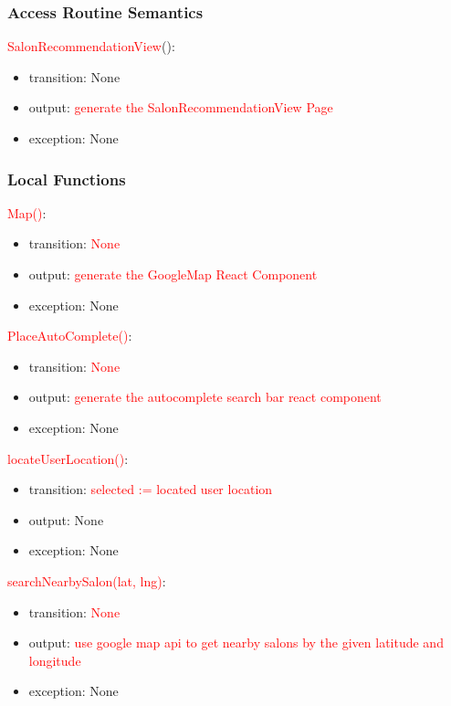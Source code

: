 \documentclass[12pt, titlepage]{article}
\begin{document}
\subsubsection{Access Routine Semantics}
\noindent \textcolor{red}{SalonRecommendationView}():
\begin{itemize}
\item transition: None
\item output: \textcolor{red}{generate the SalonRecommendationView Page} 
\item exception: None
\end{itemize}

\subsubsection{Local Functions}
\noindent \textcolor{red}{Map()}:
\begin{itemize}
\item transition: \textcolor{red}{None}
\item output: \textcolor{red}{generate the GoogleMap React Component}
\item exception: None
\end{itemize}

\noindent \textcolor{red}{PlaceAutoComplete()}:
\begin{itemize}
\item transition: \textcolor{red}{None}
\item output: \textcolor{red}{generate the autocomplete search bar react component}
\item exception: None
\end{itemize}

\noindent \textcolor{red}{locateUserLocation()}:
\begin{itemize}
\item transition: \textcolor{red}{selected := located user location }
\item output: None
\item exception: None
\end{itemize}

\noindent \textcolor{red}{searchNearbySalon(lat, lng)}:
\begin{itemize}
\item transition: \textcolor{red}{None} 
\item output: \textcolor{red}{use google map api to get nearby salons by the given latitude and longitude}
\item exception: None
\end{itemize}
\end{document}
